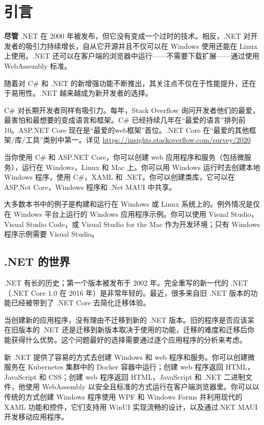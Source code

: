 \chapter*{引言}
\textbf{尽管} .NET 在 2000 年被发布，但它没有变成一个过时的技术。相反，.NET 对开发者的吸引力持续增长，自从它开源并且不仅可以在 Windows 使用还能在 Linux 上使用。.NET 还可以在客户端的浏览器中运行——不需要下载扩展——通过使用 WebAssembly 标准。

随着对 C\# 和 .NET 的新增强功能不断推出，其关注点不仅在于性能提升，还在于易用性。.NET 越来越成为新开发者的选择。

C\# 对长期开发者同样有吸引力。每年，Stack Overflow 询问开发者他们的最爱，最害怕和最想要的变成语言和框架。C\# 已经持续几年在“最爱的语言”排列前 10。ASP.NET Core 现在是“最爱的web框架”首位。.NET Core 在“最爱的其他框架/库/工具”类别中第一。详见 \url{https://insights.stackoverflow.com/survey/2020}

当你使用 C\# 和 ASP.NET Core，你可以创建 web 应用程序和服务（包括微服务），运行在 Windows，Linux 和 Mac 上。你可以用 Windows 运行时去创建本地 Windows 程序，使用 C\#，XAML 和 .NET。你可以创建类库，它可以在 ASP.Net Core，Windows 程序和 .Net MAUI 中共享。

大多数本书中的例子是构建和运行在 Windows 或 Linux 系统上的。例外情况是仅在 Windows 平台上运行的 Windows 应用程序示例。你可以使用 Visual Studio，Visual Studio Code，或 Visual Studio for the Mac 作为开发环境；只有 Windows 程序示例需要 Visual Studio。

\section*{.NET 的世界}
.NET 有长的历史；第一个版本被发布于 2002 年。完全重写的新一代的 .NET（.NET Core 1.0 在 2016 年）是非常年轻的。最近，很多来自旧 .NET 版本的功能已经被带到了 .NET Core 去简化迁移体验。

当创建新的应用程序，没有理由不迁移到新的 .NET 版本。旧的程序是否应该呆在旧版本的 .NET 还是迁移到新版本取决于使用的功能，迁移的难度和迁移后你能获得什么优势。这个问题最好的选择需要通过逐个应用程序的分析来考虑。

新 .NET 提供了容易的方式去创建 Windows 和 web 程序和服务。你可以创建微服务在 Kubernetes 集群中的 Docker 容器中运行；创建 web 程序返回 HTML，JavaScript 和 CSS；创建 web 程序返回 HTML，JavaScript 和 .NET 二进制文件，他使用 WebAssembly 以安全且标准的方式运行在客户端浏览器里。你可以以传统的方式创建 Windows 程序使用 WPF 和 Windows Forms 并利用现代的 XAML 功能和控件，它们支持用 WinUI 实现流畅的设计，以及通过.NET MAUI 开发移动应用程序。

